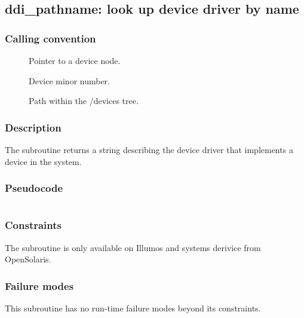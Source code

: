 \clearpage
{}
{}
\label{subr:ddi_pathname}
\subsection*{ddi\_pathname: look up device driver by name}

\subsubsection*{Calling convention}

\begin{description}
\item[] Pointer to a device node.
\item[] Device minor number.
\item[] Path within the /devices tree.
\end{description}

\subsubsection*{Description}

The  subroutine returns a string describing
the device driver that implements a device in the system.

\subsubsection*{Pseudocode}

\begin{verbatim}

\end{verbatim}

\subsubsection*{Constraints}

The  subroutine is only available on Illumos and
systems derivice from OpenSolaris.

\subsubsection*{Failure modes}

This subroutine has no run-time failure modes beyond its constraints.
